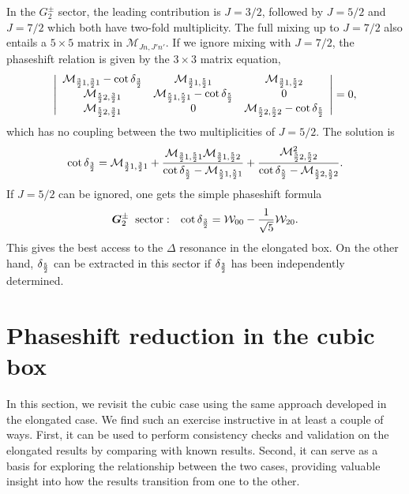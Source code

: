 \documentclass[aps,prd,reprint,showpacs,floatfix,longbibliography,,superscriptaddress]{revtex4-1}
\def\mw{\mathcal{W}}
\def\mm{\mathcal{M}}
\def\beq{\begin{equation}}
\def\eeq{\end{equation}}
\begin{document}
\begin{widetext}
In the $G^\pm_2$ sector, the leading contribution is $J=3/2$, followed by $J=5/2$ and $J=7/2$ which both have two-fold multiplicity.  
The full mixing up to $J=7/2$ also entails a $5\times 5$ matrix in $\mm_{J n , J' n' } $. 
If we ignore mixing with $J=7/2$, the phaseshift relation is given by the $3\times 3$ matrix equation,
%                                     
\beq                                                     
\left |                                     
\begin{array}{ccc}                                     
\mm_{{3\over 2}1,{3\over 2}1} - \cot\delta_{{3\over 2}} & \mm_{{3\over 2}1,{5\over 2}1}                           & \mm_{{3\over 2}1,{5\over 2}2} \\
\mm_{{5\over 2}2,{3\over 2}1}                           & \mm_{{5\over 2}1,{5\over 2}1} - \cot\delta_{{5\over 2}} & 0 \\
\mm_{{5\over 2}2,{3\over 2}1}                           & 0     & \mm_{{5\over 2}2,{5\over 2}2} - \cot\delta_{{5\over 2}}
\end{array}                                              
\right |                                           
=0,                                                      
\label{eq:detG2}                                                                  
\eeq
%
which has no coupling between the two multiplicities of $J=5/2$.
The solution is
\beq
\cot\delta_{{3\over 2}} =\mm_{{3\over 2}1,{3\over 2}1} 
+ { \mm_{{3\over 2}1,{5\over 2}1}   \mm_{{3\over 2}1,{5\over 2}2}   \over \cot\delta_{{5\over 2}}  - \mm_{{5\over 2}1,{5\over 2}1} }
+ { \mm^2_{{5\over 2}2,{5\over 2}2}    \over \cot\delta_{{5\over 2}}  - \mm_{{5\over 2}2,{5\over 2}2} }.
\label{eq:phG2}
\eeq
%
If $J=5/2$ can be ignored, one gets the simple phaseshift  formula
 \beq
  {\bm G^\pm_2 \;\;\text{sector}:}  \;\;\;
 \cot\delta_{{3\over 2}} = \mw_{00} - {1 \over \sqrt{5}} \mw_{20}.  
 \eeq 
 This gives the best access to the $\Delta$ resonance in the elongated box.
  On the other hand, $\delta_{{5\over 2}}$  can be extracted in this sector  if $\delta_{{3\over 2}}$ has been independently determined.


\section{Phaseshift reduction in the cubic box }

In this section,  we revisit the cubic case using the same 
approach developed in the elongated case. We find such an exercise instructive 
in at least  a couple of ways. 
First, it can be used to perform consistency checks and validation on the elongated results by comparing with known results.
Second, it can serve as a basis for exploring the relationship between the two cases, 
providing valuable insight into how the results transition from one to the other.


\end{widetext}
\end{document}
